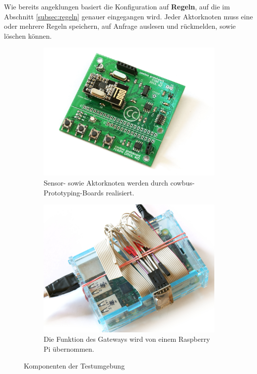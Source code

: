 \documentclass[conference]{IEEEtran}
\begin{document}
        Wie bereits angeklungen basiert die Konfiguration auf \textbf{Regeln},
        auf die im Abschnitt \ref{subsec:regeln} genauer eingegangen wird.
        Jeder Aktorknoten muss eine oder mehrere Regeln speichern,
        auf Anfrage auslesen und rückmelden, sowie löschen können.

    \begin{figure}
        \centering
        \begin{subfigure}{1\columnwidth}
            \includegraphics[width=\columnwidth]{img/img-cowbus-proto}
            \caption{Sensor- sowie Aktorknoten werden durch cowbus-Prototyping-Boards realisiert.}
            \label{subfig:proto}
        \end{subfigure}\hfill
        \begin{subfigure}{1\columnwidth}
            \includegraphics[width=\columnwidth]{img/img-pi-rf}
            \caption{Die Funktion des Gateways wird von einem Raspberry Pi übernommen.}
            \label{subfig:pi}
        \end{subfigure}\hfill
        \caption{Komponenten der Testumgebung}
        \label{fig:comp}
    \end{figure}
\end{document}

